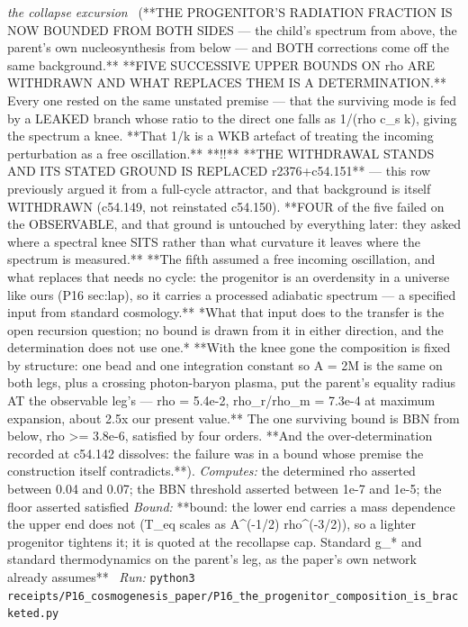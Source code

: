 \begin{description}
\textit{the collapse excursion} \ (**THE PROGENITOR'S RADIATION FRACTION IS NOW BOUNDED FROM BOTH SIDES --- the child's spectrum from above, the parent's own nucleosynthesis from below --- and BOTH corrections come off the same background.** **FIVE SUCCESSIVE UPPER BOUNDS ON rho ARE WITHDRAWN AND WHAT REPLACES THEM IS A DETERMINATION.** Every one rested on the same unstated premise --- that the surviving mode is fed by a LEAKED branch whose ratio to the direct one falls as 1/(rho c\_s k), giving the spectrum a knee. **That 1/k is a WKB artefact of treating the incoming perturbation as a free oscillation.** **!!** **THE WITHDRAWAL STANDS AND ITS STATED GROUND IS REPLACED r2376+c54.151** --- this row previously argued it from a full-cycle attractor, and that background is itself WITHDRAWN (c54.149, not reinstated c54.150). **FOUR of the five failed on the OBSERVABLE, and that ground is untouched by everything later: they asked where a spectral knee SITS rather than what curvature it leaves where the spectrum is measured.** **The fifth assumed a free incoming oscillation, and what replaces that needs no cycle: the progenitor is an overdensity in a universe like ours (P16 sec:lap), so it carries a processed adiabatic spectrum --- a specified input from standard cosmology.** *What that input does to the transfer is the open recursion question; no bound is drawn from it in either direction, and the determination does not use one.* **With the knee gone the composition is fixed by structure: one bead and one integration constant so A = 2M is the same on both legs, plus a crossing photon-baryon plasma, put the parent's equality radius AT the observable leg's --- rho = 5.4e-2, rho\_r/rho\_m = 7.3e-4 at maximum expansion, about 2.5x our present value.** The one surviving bound is BBN from below, rho >= 3.8e-6, satisfied by four orders. **And the over-determination recorded at c54.142 dissolves: the failure was in a bound whose premise the construction itself contradicts.**). 
\emph{Computes:} the determined rho asserted between 0.04 and 0.07; the BBN threshold asserted between 1e-7 and 1e-5; the floor asserted satisfied
 \emph{Bound:} **bound: the lower end carries a mass dependence the upper end does not (T\_eq scales as A\textasciicircum{}(-1/2) rho\textasciicircum{}(-3/2)), so a lighter progenitor tightens it; it is quoted at the recollapse cap. Standard g\_* and standard thermodynamics on the parent's leg, as the paper's own network already assumes**
\ \emph{Run:} \texttt{python3 receipts/P16\_cosmogenesis\_paper/P16\_the\_progenitor\_composition\_is\_bracketed.py}

\end{description}
